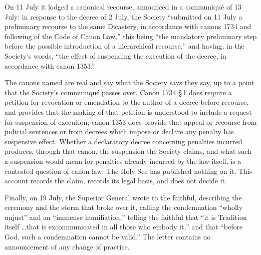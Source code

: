 On 11 July it lodged a canonical recourse, announced in a communiqué of
13 July: in response to the decree of 2 July, the Society ``submitted on
11 July a preliminary recourse to the same Dicastery, in accordance with
canons 1734 and following of the Code of Canon Law,'' this being ``the
mandatory preliminary step before the possible introduction of a
hierarchical recourse,'' and having, in the Society's words, ``the effect
of suspending the execution of the decree, in accordance with canon
1353.''

The canons named are real and say what the Society says they say, up to a
point that the Society's communiqué passes over. Canon 1734 \S\,1 does
require a petition for revocation or emendation to the author of a decree
before recourse, and provides that the making of that petition is
understood to include a request for suspension of execution; canon 1353
does provide that appeal or recourse from judicial sentences or from
decrees which impose or declare any penalty has suspensive effect.
Whether a declaratory decree concerning penalties incurred  produces, through that canon, the suspension the Society claims,
and what such a suspension would mean for penalties already incurred by
the law itself, is a contested question of canon law. The Holy See has
published nothing on it. This account records the claim, records its
legal basis, and does not decide it.

Finally, on 19 July, the Superior General wrote to the faithful,
describing the ceremony and the storm that broke over it, calling the
condemnation ``wholly unjust'' and an ``immense humiliation,'' telling
the faithful that ``it is Tradition itself \ldots that is excommunicated
in all those who embody it,'' and that ``before God, such a condemnation
cannot be valid.'' The letter contains no announcement of any change of
practice.

